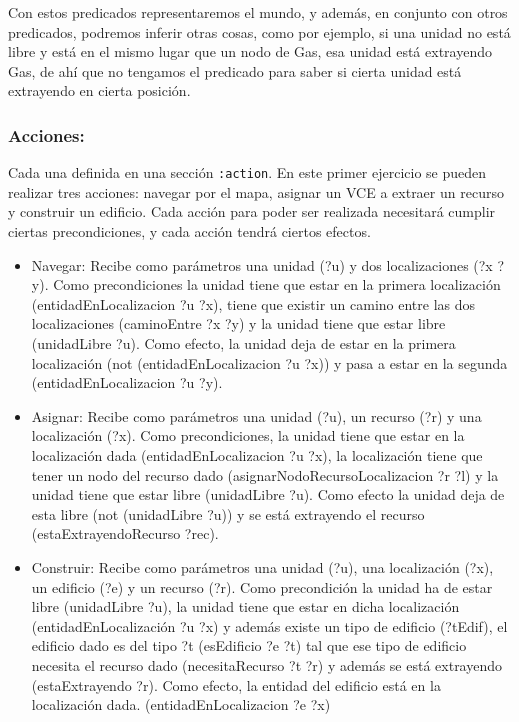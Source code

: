 \documentclass[11pt, spanish]{article}
\begin{document}
Con estos predicados representaremos el mundo, y además, en conjunto con otros predicados, podremos inferir otras cosas, como por ejemplo, si una unidad no está libre y está en el mismo lugar que un nodo de Gas, esa unidad está extrayendo Gas, de ahí que no tengamos el predicado para saber si cierta unidad está extrayendo en cierta posición.

\subsubsection{Acciones:}

Cada una definida en una sección \texttt{:action}. En este primer ejercicio se pueden realizar tres acciones: navegar por el mapa, asignar un VCE a extraer un recurso y construir un edificio. Cada acción para poder ser realizada necesitará cumplir ciertas precondiciones, y cada acción tendrá ciertos efectos.

\begin{itemize}
	\item Navegar: Recibe como parámetros una unidad (?u) y dos localizaciones (?x ?y). Como precondiciones la unidad tiene que estar en la primera localización (entidadEnLocalizacion ?u ?x), tiene que existir un camino entre las dos localizaciones (caminoEntre ?x ?y) y la unidad tiene que estar libre (unidadLibre ?u). Como efecto, la unidad deja de estar en la primera localización (not (entidadEnLocalizacion ?u ?x)) y pasa a estar en la segunda (entidadEnLocalizacion ?u ?y).
	\item Asignar: Recibe como parámetros una unidad (?u), un recurso (?r) y una localización (?x). Como precondiciones, la unidad tiene que estar en la localización dada (entidadEnLocalizacion ?u ?x), la localización tiene que tener un nodo del recurso dado (asignarNodoRecursoLocalizacion ?r ?l) y la unidad tiene que estar libre (unidadLibre ?u). Como efecto la unidad deja de esta libre (not (unidadLibre ?u)) y se está extrayendo el recurso (estaExtrayendoRecurso ?rec).
	\item Construir: Recibe como parámetros una unidad (?u), una localización (?x), un edificio (?e) y un recurso (?r). Como precondición la unidad ha de estar libre (unidadLibre ?u), la unidad tiene que estar en dicha localización (entidadEnLocalización ?u ?x) y además existe un tipo de edificio (?tEdif), el edificio dado es del tipo ?t (esEdificio ?e ?t) tal que ese tipo de edificio necesita el recurso dado (necesitaRecurso ?t ?r) y además se está extrayendo (estaExtrayendo ?r). Como efecto, la entidad del edificio está en la localización dada. (entidadEnLocalizacion ?e ?x)
\end{itemize}
\end{document}
